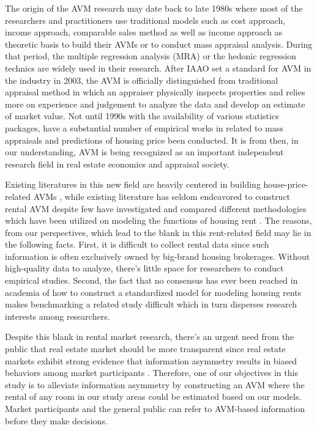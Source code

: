 \documentclass[a4paper, 12pt]{article} %
\begin{document}
The origin of the AVM research may date back to late 1980s where most of the researchers and practitioners use traditional models such as cost approach, income approach, comparable sales method as well as income approach as theoretic basis to build their AVMs or to conduct mass appraisal analysis. During that period, the multiple regression analysis (MRA) or the hedonic regression technics are widely used in their research\citep{uspap, d1986goodness}. After IAAO set a standard for AVM in the industry in 2003, the AVM is officially distinguished from traditional appraisal method in which an appraiser physically inspects properties and relies more on experience and judgement to analyze the data and develop an estimate of market value. Not until 1990s with the availability of various statistics packages, have a substantial number of empirical works in related to mass appraisals and predictions of housing price been conducted. It is from then, in our understanding, AVM is being recognized as an important independent research field in real estate economics and appraisal society. 

Existing literatures in this new field are heavily centered in building house-price-related AVMs \citep{faishal2005automated, garcia2008ann+}, while existing literature has seldom endeavored to construct rental AVM despite few have investigated and compared different methodologies which have been utilized on modeling the functions of housing rent \citep{brunauer2010additive, djurdjevic2008estimation, lochl2010modelling, seya2011empirical}. The reasons, from our perspectives, which lead to the blank in this rent-related field may lie in the following facts. First, it is difficult to collect rental data since such information is often exclusively owned by big-brand housing brokerages. Without high-quality data to analyze, there’s little space for researchers to conduct empirical studies. Second, the fact that no consensus has ever been reached in academia of how to construct a standardized model for modeling housing rents makes benchmarking a related study difficult which in turn disperses research interests among researchers.  

Despite this blank in rental market research, there’s an urgent need from the public that real estate market should be more transparent since real estate markets exhibit strong evidence that information asymmetry results in biased behaviors among market participants \citep{garmaise2003confronting}. Therefore, one of our objectives in this study is to alleviate information asymmetry by constructing an AVM where the rental of any room in our study areas could be estimated based on our models. Market participants and the general public can refer to AVM-based information before they make decisions. 
\end{document}
